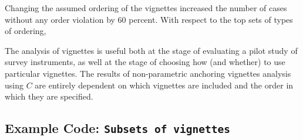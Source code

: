 \documentclass{amsart}
\begin{document}
Changing the assumed ordering of the vignettes increased the number of
cases without any order violation by 60 percent.  With respect to the
top sets of types of ordering,

The analysis of vignettes is useful both at the stage of evaluating a
pilot study of survey instruments, as well at the stage of choosing
how (and whether) to use particular vignettes.  The results of
non-parametric anchoring vignettes analysis using $C$ are entirely
dependent on which vignettes are included and the order in which they
are specified.

\subsection{Example Code: \texttt{Subsets of vignettes}}
\end{document}

